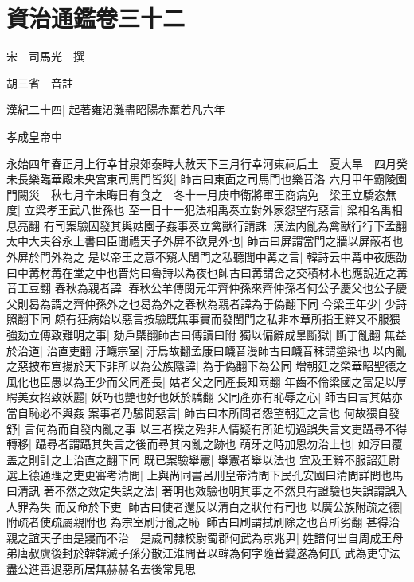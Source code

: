 \chapter{資治通鑑卷三十二}
宋　司馬光　撰

胡三省　音註

漢紀二十四|{
	起著雍涒灘盡昭陽赤奮若凡六年}


孝成皇帝中

永始四年春正月上行幸甘泉郊泰畤大赦天下三月行幸河東祠后土　夏大旱　四月癸未長樂臨華殿未央宫東司馬門皆災|{
	師古曰東面之司馬門也樂音洛}
六月甲午霸陵園門闕災　秋七月辛未晦日有食之　冬十一月庚申衛將軍王商病免　梁王立驕恣無度|{
	立梁孝王武八世孫也}
至一日十一犯法相禹奏立對外家怨望有惡言|{
	梁相名禹相息亮翻}
有司案驗因發其與姑園子姦事奏立禽獸行請誅|{
	漢法内亂為禽獸行行下孟翻}
太中大夫谷永上書曰臣聞禮天子外屏不欲見外也|{
	師古曰屏謂當門之牆以屏蔽者也外屏於門外為之}
是以帝王之意不窺人閨門之私聽聞中冓之言|{
	韓詩云中冓中夜應劭曰中冓材冓在堂之中也晋灼曰魯詩以為夜也師古曰冓謂舍之交積材木也應說近之冓音工豆翻}
春秋為親者諱|{
	春秋公羊傳閔元年齊仲孫來齊仲孫者何公子慶父也公子慶父則曷為謂之齊仲孫外之也曷為外之春秋為親者諱為于偽翻下同}
今梁王年少|{
	少詩照翻下同}
頗有狂病始以惡言按驗既無事實而發閨門之私非本章所指王辭又不服猥強劾立傅致難明之事|{
	劾戶槩翻師古曰傅讀曰附}
獨以偏辭成辠斷獄|{
	斷丁亂翻}
無益於治道|{
	治直吏翻}
汙衊宗室|{
	汙烏故翻孟康曰衊音漫師古曰衊音秣謂塗染也}
以内亂之惡披布宣揚於天下非所以為公族隱諱|{
	為于偽翻下為公同}
增朝廷之榮華昭聖德之風化也臣愚以為王少而父同產長|{
	姑者父之同產長知兩翻}
年齒不倫梁國之富足以厚聘美女招致妖麗|{
	妖巧也艷也好也妖於驕翻}
父同產亦有恥辱之心|{
	師古曰言其姑亦當自恥必不與姦}
案事者乃驗問惡言|{
	師古曰本所問者怨望朝廷之言也}
何故猥自發舒|{
	言何為而自發内亂之事}
以三者揆之殆非人情疑有所廹切過誤失言文吏躡尋不得轉移|{
	躡尋者謂躡其失言之後而尋其内亂之跡也}
萌牙之時加恩勿治上也|{
	如淳曰覆盖之則計之上治直之翻下同}
既已案驗舉憲|{
	舉憲者舉以法也}
宜及王辭不服詔廷尉選上德通理之吏更審考清問|{
	上與尚同書呂刑皇帝清問下民孔安國曰清問詳問也馬曰清訊}
著不然之效定失誤之法|{
	著明也效驗也明其事之不然具有證驗也失誤謂誤入人罪為失}
而反命於下吏|{
	師古曰使者還反以清白之狀付有司也}
以廣公族附疏之德|{
	附疏者使疏屬親附也}
為宗室刷汙亂之恥|{
	師古曰刷謂拭刷除之也音所劣翻}
甚得治親之誼天子由是寢而不治　是歲司隸校尉蜀郡何武為京兆尹|{
	姓譜何出自周成王母弟唐叔虞後封於韓韓滅子孫分散江淮問音以韓為何字隨音變遂為何氏}
武為吏守法盡公進善退惡所居無赫赫名去後常見思

